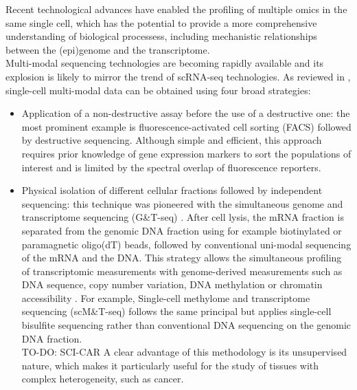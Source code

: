 Recent technological advances have enabled the profiling of multiple omics in the same single cell, which has the potential to provide a more comprehensive understanding of biological processess, including mechanistic relationships between the (epi)genome and the transcriptome.\\
Multi-modal sequencing technologies are becoming rapidly available and its explosion is likely to mirror the trend of scRNA-seq technologies. As reviewed in \cite{Stuart2019,Chappell2018}, single-cell multi-modal data can be obtained using four broad strategies:
\begin{itemize}
	
	\item Application of a non-destructive assay before the use of a destructive one: the most prominent example is fluorescence-activated cell sorting (FACS) followed by destructive sequencing. Although simple and efficient, this approach requires prior knowledge of gene expression markers to sort the populations of interest and is limited by the spectral overlap of fluorescence reporters.

	\item Physical isolation of different cellular fractions followed by independent sequencing: this technique was pioneered with the simultaneous genome and transcriptome sequencing (G\&T-seq) \cite{Macaulay2015}. After cell lysis, the mRNA fraction is separated from the genomic DNA fraction using for example biotinylated or paramagnetic oligo(dT) beads, followed by conventional uni-modal sequencing of the mRNA and the DNA. This strategy allows the simultaneous profiling of transcriptomic measurements with genome-derived measurements such as DNA sequence, copy number variation, DNA methylation or chromatin accessibility \cite{XX}. For example, Single-cell methylome and transcriptome sequencing (scM\&T-seq) \cite{Angermueller2016} follows the same principal but applies single-cell bisulfite sequencing rather than conventional DNA sequencing on the genomic DNA fraction.\\
		TO-DO: SCI-CAR
	A clear advantage of this methodology is its unsupervised nature, which makes it particularly useful for the study of tissues with complex heterogeneity, such as cancer.


\end{itemize}
